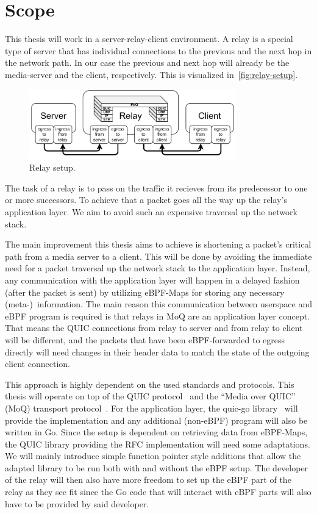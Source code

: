 \section{Scope}\label{sec:scope}

This thesis will work in a server-relay-client environment.
A relay is a special type of server that has individual 
connections to the previous and the next hop in the network path.
In our case the previous and next hop will already be the media-server and 
the client, respectively.
This is visualized in~\autoref{fig:relay-setup}.
\vspace{0.5cm}
\begin{figure}[H]
    \centering
    \includegraphics[width=0.8\textwidth]{figures/02_background/general-relay.drawio.pdf}
    \caption[Server-Relay-Client-Setup]{Relay setup.}\label{fig:relay-setup}
\end{figure}
The task of a relay is to pass on the traffic it recieves from its predecessor
to one or more successors.
To achieve that a packet goes all the way up the relay's application layer.
We aim to avoid such an expensive traversal up the network stack.

The main improvement this thesis aims to achieve is shortening a packet's critical path from a media server to a client.
This will be done by avoiding the immediate need for a packet traversal up the network stack to the application layer.
Instead, any communication with the application layer will happen in a delayed fashion (after the packet is sent) by utilizing 
eBPF-Maps for storing any necessary (meta-)~information.
The main reason this communication between userspace and eBPF program is required is that relays in MoQ are an application layer concept.
That means the QUIC connections from relay to server and from relay to client will be different, and the packets that have been eBPF-forwarded to egress directly will need changes in their header data to match the state of the outgoing client connection.  

This approach is highly dependent on the used standards and protocols.
This thesis will operate on top of the QUIC protocol~\parencite{rfc-9000} and the ``Media over QUIC'' (MoQ) 
transport protocol~\parencite{draft-moqtransport}.
For the application layer, the quic-go library~\parencite{quic-go-repo} will provide the implementation and 
any additional (non-eBPF) program will also be written in Go.
Since the setup is dependent on retrieving data from eBPF-Maps, the QUIC library providing the RFC implementation 
will need some adaptations.
We will mainly introduce simple function pointer style additions that allow the adapted library to be run 
both with and without the eBPF setup.
The developer of the relay will then also have more freedom to set up the eBPF part of the relay as they see fit
since the Go code that will interact with eBPF parts will also have to be provided by said developer.

